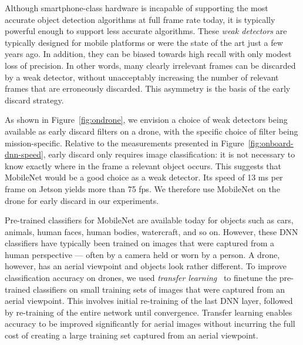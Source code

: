 Although smartphone-class hardware is incapable of supporting the
most accurate object detection algorithms at full frame rate today, it is
typically powerful enough to support less accurate algorithms.  These {\em weak
detectors} are typically designed for mobile platforms or were the state of the
art just a few years ago.  In addition, they can be biased towards high recall
with only modest loss of precision.  In other words, many clearly irrelevant
frames can be discarded by a weak detector, without unacceptably increasing the
number of relevant frames that are erroneously discarded.  This asymmetry is the
basis of the early discard strategy.

As shown in Figure~\ref{fig:ondrone}, we envision a choice of weak detectors
being available as early discard filters on a drone, with the specific choice of
filter being mission-specific.  Relative to the measurements presented in
Figure~\ref{fig:onboard-dnn-speed}, early discard only requires image
classification: it is not necessary to know exactly where in the frame a
relevant object occurs.  This suggests that MobileNet would be a good choice as
a weak detector. Its speed of 13 ms per frame on Jetson yields more than 75 fps.
We therefore use MobileNet on the drone for early discard in our experiments.

Pre-trained classifiers for MobileNet are available today for objects such as
cars, animals, human faces, human bodies, watercraft, and so on.  However, these
DNN classifiers have typically been trained on images that were captured from a
human perspective --- often by a camera held or worn by a person.  A drone,
however, has an aerial viewpoint and objects look rather different.  To improve
classification accuracy on drones, we used {\em transfer learning}~\cite{Yosinski2014} to finetune
the pre-trained classifiers on small training sets of images that were captured
from an aerial viewpoint.  This involves initial re-training of the last DNN
layer, followed by re-training of the entire network until convergence. Transfer
learning enables accuracy to be improved significantly for aerial images without
incurring the full cost of creating a large training set captured from an aerial
viewpoint.

